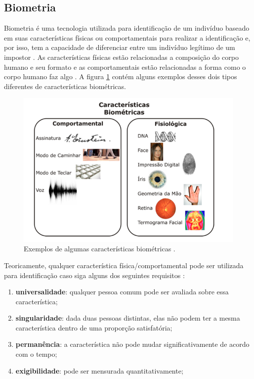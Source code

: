 \subsection{Biometria}
\label{sec:biometria}
Biometria é uma tecnologia utilizada para identificação de um indivíduo baseado em suas características físicas ou comportamentais para realizar a identificação e, por isso, tem a capacidade de diferenciar entre um indivíduo legítimo de um impostor \cite{hong}. As características físicas estão relacionadas a composição do corpo humano e seu formato e as comportamentais estão relacionadas a forma como o corpo humano faz algo \cite{drovetto}. A figura \ref{caracteristicasBiometricas} contém alguns exemplos desses dois tipos diferentes de características biométricas.

	\begin{figure}[H]
		\begin{center}
			\includegraphics[scale=0.5]{figuras/2.FundamentacaoTeorica/caracteristicasBiometricas.png}
		\end{center}
		\caption{Exemplos de algumas características biométricas \cite{drovetto}.}
		\label{caracteristicasBiometricas}
	\end{figure}


Teoricamente, qualquer característica física/comportamental pode ser utilizada para identificação caso siga alguns dos seguintes requisitos \cite{milene}: 

	\begin{enumerate}
		\item \textbf{universalidade}: qualquer pessoa comum pode ser avaliada sobre essa característica;
		\item \textbf{singularidade}: dada duas pessoas distintas, elas não podem ter a mesma característica dentro de uma proporção satisfatória;
		\item \textbf{permanência}: a característica não pode mudar significativamente de acordo com o tempo;
		\item \textbf{exigibilidade}: pode ser mensurada quantitativamente;
	\end{enumerate}

